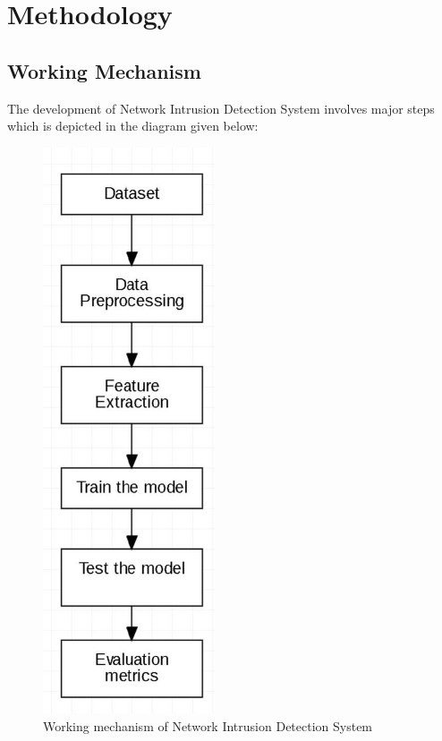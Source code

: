 \chapter{Methodology}
\section{Working Mechanism}
\vspace{-18pt}
The development of Network Intrusion Detection System involves major steps which is 
depicted in the diagram given below:
\begin{figure}[tbh] %
\begin{center}
	\includegraphics[width=2in]{images/ww1.jpg} 
	\caption{Working mechanism of Network Intrusion Detection System} %
	\label{Working mechanism of Network Intrusion Detection System} %
\end{center}
\end{figure}
